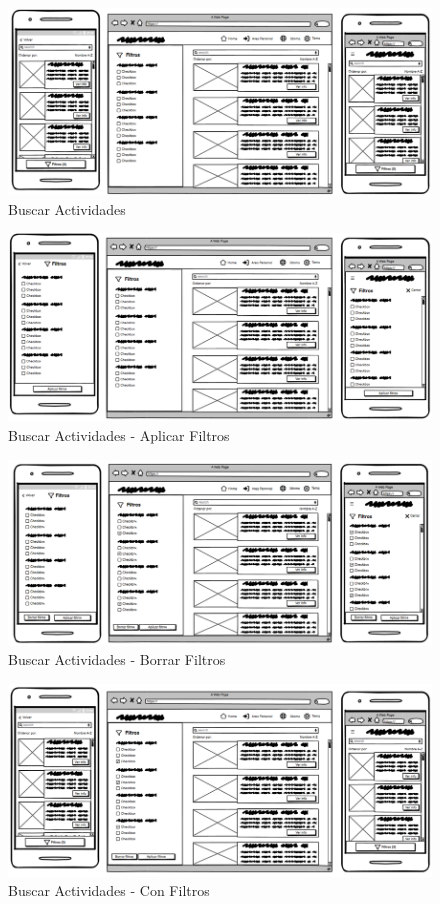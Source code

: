 \begin{figure}[H]
	\centering
	\includegraphics[width=0.8\linewidth]{5-AnalisisDelSistemaDeInformacion/InterfacesDeUsuario/BuscarActividades/buscar-standar.png}
	\caption{Buscar Actividades}
\end{figure}

\begin{figure}[H]
	\centering
	\includegraphics[width=0.8\linewidth]{5-AnalisisDelSistemaDeInformacion/InterfacesDeUsuario/BuscarActividades/buscar-standar-aplicando-filtros.png}
	\caption{Buscar Actividades - Aplicar Filtros}
\end{figure}

\begin{figure}[H]
	\centering
	\includegraphics[width=0.8\linewidth]{5-AnalisisDelSistemaDeInformacion/InterfacesDeUsuario/BuscarActividades/buscar-standar-borrar-filtros.png}
	\caption{Buscar Actividades - Borrar Filtros}
\end{figure}

\begin{figure}[H]
	\centering
	\includegraphics[width=0.8\linewidth]{5-AnalisisDelSistemaDeInformacion/InterfacesDeUsuario/BuscarActividades/buscar-standar-con-filtros.png}
	\caption{Buscar Actividades - Con Filtros}
\end{figure}


